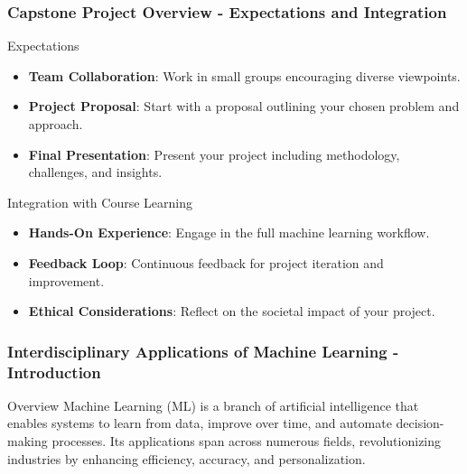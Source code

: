\documentclass[aspectratio=169]{beamer}
\begin{document}
\begin{frame}[fragile]
    \frametitle{Capstone Project Overview - Expectations and Integration}
    \begin{block}{Expectations}
        \begin{itemize}
            \item \textbf{Team Collaboration}: Work in small groups encouraging diverse viewpoints.
            \item \textbf{Project Proposal}: Start with a proposal outlining your chosen problem and approach.
            \item \textbf{Final Presentation}: Present your project including methodology, challenges, and insights.
        \end{itemize}
    \end{block}

    \begin{block}{Integration with Course Learning}
        \begin{itemize}
            \item \textbf{Hands-On Experience}: Engage in the full machine learning workflow.
            \item \textbf{Feedback Loop}: Continuous feedback for project iteration and improvement.
            \item \textbf{Ethical Considerations}: Reflect on the societal impact of your project.
        \end{itemize}
    \end{block}
\end{frame}

\begin{frame}[fragile]
    \frametitle{Interdisciplinary Applications of Machine Learning - Introduction}
    \begin{block}{Overview}
        Machine Learning (ML) is a branch of artificial intelligence that enables systems to learn from data, improve over time, and automate decision-making processes. 
        Its applications span across numerous fields, revolutionizing industries by enhancing efficiency, accuracy, and personalization.
    \end{block}
\end{frame}
\end{document}
